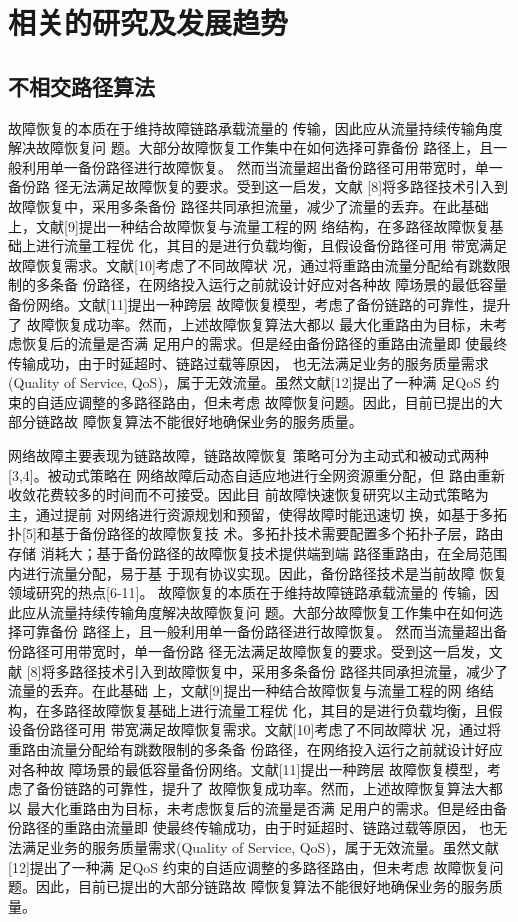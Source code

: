 \section{相关的研究及发展趋势}
\subsection{不相交路径算法}
故障恢复的本质在于维持故障链路承载流量的
传输，因此应从流量持续传输角度解决故障恢复问
题。大部分故障恢复工作集中在如何选择可靠备份
路径上，且一般利用单一备份路径进行故障恢复。
然而当流量超出备份路径可用带宽时，单一备份路
径无法满足故障恢复的要求。受到这一启发，文献
[8]将多路径技术引入到故障恢复中，采用多条备份
路径共同承担流量，减少了流量的丢弃。在此基础
上，文献[9]提出一种结合故障恢复与流量工程的网
络结构，在多路径故障恢复基础上进行流量工程优
化，其目的是进行负载均衡，且假设备份路径可用
带宽满足故障恢复需求。文献[10]考虑了不同故障状
况，通过将重路由流量分配给有跳数限制的多条备
份路径，在网络投入运行之前就设计好应对各种故
障场景的最低容量备份网络。文献[11]提出一种跨层
故障恢复模型，考虑了备份链路的可靠性，提升了
故障恢复成功率。然而，上述故障恢复算法大都以
最大化重路由为目标，未考虑恢复后的流量是否满
足用户的需求。但是经由备份路径的重路由流量即
使最终传输成功，由于时延超时、链路过载等原因，
也无法满足业务的服务质量需求(Quality of Service,
QoS)，属于无效流量。虽然文献[12]提出了一种满
足QoS 约束的自适应调整的多路径路由，但未考虑
故障恢复问题。因此，目前已提出的大部分链路故
障恢复算法不能很好地确保业务的服务质量。


网络故障主要表现为链路故障，链路故障恢复
策略可分为主动式和被动式两种[3,4]。被动式策略在
网络故障后动态自适应地进行全网资源重分配，但
路由重新收敛花费较多的时间而不可接受。因此目
前故障快速恢复研究以主动式策略为主，通过提前
对网络进行资源规划和预留，使得故障时能迅速切
换，如基于多拓扑[5]和基于备份路径的故障恢复技
术。多拓扑技术需要配置多个拓扑子层，路由存储
消耗大；基于备份路径的故障恢复技术提供端到端
路径重路由，在全局范围内进行流量分配，易于基
于现有协议实现。因此，备份路径技术是当前故障
恢复领域研究的热点[6-11]。
故障恢复的本质在于维持故障链路承载流量的
传输，因此应从流量持续传输角度解决故障恢复问
题。大部分故障恢复工作集中在如何选择可靠备份
路径上，且一般利用单一备份路径进行故障恢复。
然而当流量超出备份路径可用带宽时，单一备份路
径无法满足故障恢复的要求。受到这一启发，文献
[8]将多路径技术引入到故障恢复中，采用多条备份
路径共同承担流量，减少了流量的丢弃。在此基础
上，文献[9]提出一种结合故障恢复与流量工程的网
络结构，在多路径故障恢复基础上进行流量工程优
化，其目的是进行负载均衡，且假设备份路径可用
带宽满足故障恢复需求。文献[10]考虑了不同故障状
况，通过将重路由流量分配给有跳数限制的多条备
份路径，在网络投入运行之前就设计好应对各种故
障场景的最低容量备份网络。文献[11]提出一种跨层
故障恢复模型，考虑了备份链路的可靠性，提升了
故障恢复成功率。然而，上述故障恢复算法大都以
最大化重路由为目标，未考虑恢复后的流量是否满
足用户的需求。但是经由备份路径的重路由流量即
使最终传输成功，由于时延超时、链路过载等原因，
也无法满足业务的服务质量需求(Quality of Service,
QoS)，属于无效流量。虽然文献[12]提出了一种满
足QoS 约束的自适应调整的多路径路由，但未考虑
故障恢复问题。因此，目前已提出的大部分链路故
障恢复算法不能很好地确保业务的服务质量。


